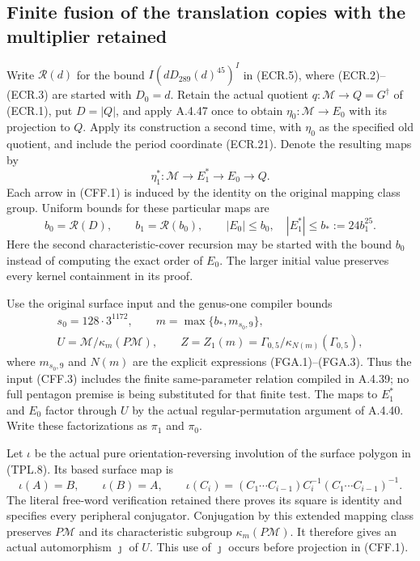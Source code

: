 \subsection{Finite fusion of the translation copies with the multiplier retained}

Write $\mathcal R(d)$ for the bound
$I(dD_{289}(d)^{45})^I$ in (ECR.5), where (ECR.2)--(ECR.3)
are started with $D_0=d$.  Retain the actual quotient
$q:\mathcal M\to Q=G^\dagger$ of (ECR.1), put $D=|Q|$, and
apply A.4.47 once to obtain
$\eta_0:\mathcal M\to E_0$ with its projection to $Q$.
Apply its construction a second time, with $\eta_0$ as the
specified old quotient, and include the period coordinate
(ECR.21).  Denote the resulting maps by
\[
 \eta_1^*:\mathcal M\longrightarrow E_1^*
          \longrightarrow E_0\longrightarrow Q.
                                                               \tag{CFF.1}
\]
Each arrow in (CFF.1) is induced by the identity on the original
mapping class group.  Uniform bounds for these particular maps are
\[
 b_0=\mathcal R(D),\qquad b_1=\mathcal R(b_0),\qquad
 |E_0|\leq b_0,\quad |E_1^*|\leq b_*:=24b_1^{25}.
                                                               \tag{CFF.2}
\]
Here the second characteristic-cover recursion may be started
with the bound $b_0$ instead of computing the exact order of $E_0$.
The larger initial value preserves every kernel containment in its
proof.

Use the original surface input and the genus-one compiler bounds
\[
 \begin{gathered}
 s_0=128\cdot3^{1172},\qquad
 m=\max\{b_*,m_{s_0,9}\},\\
 U=\mathcal M/\kappa_m(P\mathcal M),\qquad
 Z=Z_1(m)=\Gamma_{0,5}/\kappa_{N(m)}(\Gamma_{0,5}),
 \end{gathered}                                                \tag{CFF.3}
\]
where $m_{s_0,9}$ and $N(m)$ are the explicit expressions
(FGA.1)--(FGA.3).  Thus the input (CFF.3) includes the finite
same-parameter relation compiled in A.4.39; no full pentagon premise
is being substituted for that finite test.
The maps to $E_1^*$ and $E_0$ factor through $U$ by the actual
regular-permutation argument of A.4.40.  Write these factorizations
as $\pi_1$ and $\pi_0$.

Let $\iota$ be the actual pure orientation-reversing involution
of the surface polygon in (TPL.8).  Its based surface map is
\[
 \iota(A)=B,\qquad\iota(B)=A,\qquad
 \iota(C_i)=(C_1\cdots C_{i-1})C_i^{-1}
                              (C_1\cdots C_{i-1})^{-1}.
                                                               \tag{CFF.4}
\]
The literal free-word verification retained there proves its
square is identity and specifies every peripheral conjugator.
Conjugation by this extended mapping class preserves
$P\mathcal M$ and its characteristic subgroup $\kappa_m(P\mathcal M)$.
It therefore gives an actual automorphism $\jmath$ of $U$.
This use of $\jmath$ occurs before projection in (CFF.1).

